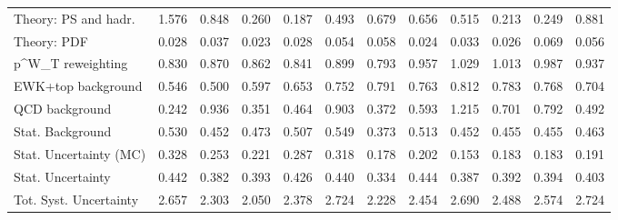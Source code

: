 \begin{tabular}{l|p{0.6cm}p{0.6cm}p{0.6cm}p{0.6cm}p{0.6cm}p{0.6cm}p{0.6cm}p{0.6cm}p{0.6cm}p{0.6cm}p{0.6cm}}
Theory: PS and hadr.                     & 1.576 & 0.848 & 0.260 & 0.187 & 0.493 & 0.679 & 0.656 & 0.515 & 0.213 & 0.249 & 0.881 \\
Theory: PDF                              & 0.028 & 0.037 & 0.023 & 0.028 & 0.054 & 0.058 & 0.024 & 0.033 & 0.026 & 0.069 & 0.056 \\
p^{W}_{T} reweighting                    & 0.830 & 0.870 & 0.862 & 0.841 & 0.899 & 0.793 & 0.957 & 1.029 & 1.013 & 0.987 & 0.937 \\
EWK+top background                       & 0.546 & 0.500 & 0.597 & 0.653 & 0.752 & 0.791 & 0.763 & 0.812 & 0.783 & 0.768 & 0.704 \\
QCD background                           & 0.242 & 0.936 & 0.351 & 0.464 & 0.903 & 0.372 & 0.593 & 1.215 & 0.701 & 0.792 & 0.492 \\
Stat. Background                         & 0.530 & 0.452 & 0.473 & 0.507 & 0.549 & 0.373 & 0.513 & 0.452 & 0.455 & 0.455 & 0.463 \\
Stat. Uncertainty (MC)                   & 0.328 & 0.253 & 0.221 & 0.287 & 0.318 & 0.178 & 0.202 & 0.153 & 0.183 & 0.183 & 0.191 \\
\hline
Stat. Uncertainty                        & 0.442 & 0.382 & 0.393 & 0.426 & 0.440 & 0.334 & 0.444 & 0.387 & 0.392 & 0.394 & 0.403 \\
\hline
Tot. Syst. Uncertainty                   & 2.657 & 2.303 & 2.050 & 2.378 & 2.724 & 2.228 & 2.454 & 2.690 & 2.488 & 2.574 & 2.724 \\
\hline
\end{tabular}
